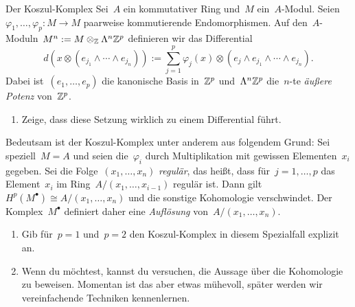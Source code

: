 \documentclass{uebblatt}
\begin{document}
\begin{aufgabe}{Der Koszul-Komplex}
Sei~$A$ ein kommutativer Ring und~$M$ ein~$A$-Modul.
Seien~$\varphi_1,\ldots,\varphi_p : M \to M$ paarweise kommutierende
Endomorphismen. Auf den~$A$-Moduln~$M^n := M \otimes_{\mathbb{Z}} \Lambda^n \mathbb{Z}^p$
definieren wir das Differential
\[ d(x \otimes (e_{j_1} \wedge \cdots \wedge e_{j_n})) :=
  \sum_{j=1}^p \varphi_j(x) \otimes (e_j \wedge e_{j_1} \wedge \cdots \wedge
  e_{j_n}). \]
Dabei ist~$(e_1,\ldots,e_p)$ die kanonische Basis in~$\mathbb{Z}^p$ und~$\Lambda^n
\mathbb{Z}^p$ die~$n$-te \emph{äußere Potenz} von~$\mathbb{Z}^p$.
\begin{enumerate}
\item Zeige, dass diese Setzung wirklich zu einem Differential führt.
\end{enumerate}
Bedeutsam ist der Koszul-Komplex unter anderem aus folgendem Grund:
Sei speziell~$M = A$ und seien die~$\varphi_i$ durch Multiplikation mit
gewissen Elementen~$x_i$ gegeben. Sei die Folge~$(x_1,\ldots,x_n)$
\emph{regulär}, das heißt, dass für~$j = 1,\ldots,p$ das Element~$x_i$ im
Ring~$A/(x_1,\ldots,x_{i-1})$ regulär ist. Dann gilt~$H^p(M^\bullet) \cong
A/(x_1,\ldots,x_n)$ und die sonstige Kohomologie verschwindet. Der
Komplex~$M^\bullet$ definiert daher eine \emph{Auflösung}
von~$A/(x_1,\ldots,x_n)$.
\begin{enumerate}
\addtocounter{enumi}{1}
\item Gib für~$p = 1$ und~$p= 2$ den Koszul-Komplex in diesem Spezialfall
explizit an.
\item Wenn du möchtest, kannst du versuchen, die Aussage über die Kohomologie
zu beweisen. Momentan ist das aber etwas mühevoll, später werden wir
vereinfachende Techniken kennenlernen.
\end{enumerate}
\end{aufgabe}
\end{document}
